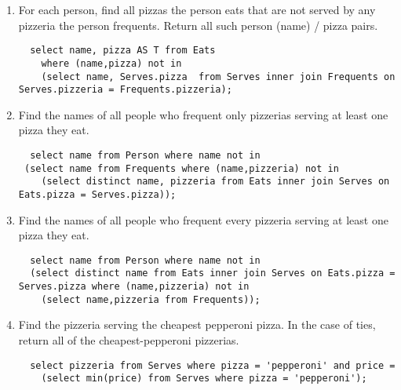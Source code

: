 \documentclass[a4paper,12pt]{article}
\begin{document}
\begin{enumerate}
 \hline
 \item For each person, find all pizzas the person eats that are not served by any pizzeria the person frequents. Return all such person (name) / pizza pairs.
 \begin{lstlisting}
  select name, pizza AS T from Eats
	where (name,pizza) not in
    (select name, Serves.pizza  from Serves inner join Frequents on Serves.pizzeria = Frequents.pizzeria);
 \end{lstlisting}
 \item Find the names of all people who frequent only pizzerias serving at least one pizza they eat.
 \begin{lstlisting}
  select name from Person where name not in
 (select name from Frequents where (name,pizzeria) not in
	(select distinct name, pizzeria from Eats inner join Serves on Eats.pizza = Serves.pizza)); 
 \end{lstlisting}
 \item Find the names of all people who frequent every pizzeria serving at least one pizza they eat.
 \begin{lstlisting}
  select name from Person where name not in
  (select distinct name from Eats inner join Serves on Eats.pizza = Serves.pizza where (name,pizzeria) not in
	(select name,pizzeria from Frequents));
 \end{lstlisting}
 \item Find the pizzeria serving the cheapest pepperoni pizza. In the case of ties, return all of the cheapest-pepperoni pizzerias.
 \begin{lstlisting}
  select pizzeria from Serves where pizza = 'pepperoni' and price =
	(select min(price) from Serves where pizza = 'pepperoni');
 \end{lstlisting}
\end{enumerate}
\end{document}
